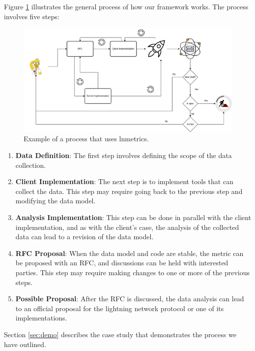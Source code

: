 Figure \ref{fig:lnmetrics_process} illustrates the general process of how 
our framework works. The process involves five steps:

\begin{figure}
    \begin{center}
      \includegraphics[scale=0.7]{imgs/lnmetrics-workflow-drawio.png}
    \end{center}
    \caption{Example of a process that uses lnmetrics.}
    \label{fig:lnmetrics_process}
\end{figure}


\begin{enumerate}
\item {\bf Data Definition}: The first step involves defining the 
    scope of the data collection.
\item {\bf Client Implementation}: The next step is to implement tools that 
    can collect the data. This step may require going back to the previous step 
        and modifying the data model.
\item {\bf Analysis Implementation}: This step can be done in parallel with the 
    client implementation, and as with the client's case, the analysis of the 
        collected data can lead to a revision of the data model.
\item {\bf RFC Proposal}: When the data model and code are stable, the metric can be proposed 
    with an RFC, and discussions can be held with interested parties. This step may 
        require making changes to one or more of the previous steps.
\item {\bf Possible Proposal}: After the RFC is discussed, the data analysis can lead to an official 
    proposal for the lightning network protocol or one of its implementations.
\end{enumerate}

Section \ref{sec:demo} describes the case study that demonstrates the process we have outlined.

